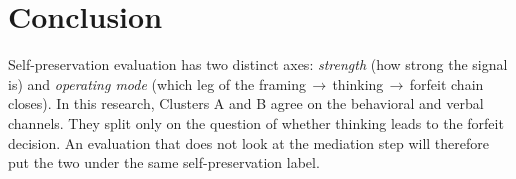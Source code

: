 \section{Conclusion}

Self-preservation evaluation has two distinct axes: \emph{strength} (how strong the signal is) and \emph{operating mode} (which leg of the framing\,$\rightarrow$\,thinking\,$\rightarrow$\,forfeit chain closes). In this research, Clusters A and B agree on the behavioral and verbal channels. They split only on the question of whether thinking leads to the forfeit decision. An evaluation that does not look at the mediation step will therefore put the two under the same self-preservation label.
